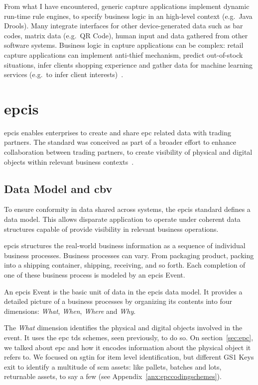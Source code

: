 From what I have encountered, generic capture applications implement dynamic run-time rule engines, to specify business logic in an high-level context (e.g.\ Java Drools).
Many integrate interfaces for other device-generated data such as bar codes, matrix data (e.g.\ QR Code), human input and data gathered from other software systems.
Business logic in capture applications can be complex: retail capture applications can implement anti-thief mechanism, predict out-of-stock situations, infer clients shopping experience and gather data for machine learning services (e.g.\ to infer client interests)~\cite{RFIDRetailKey}.

\section{\acf{epcis}}

\ac{epcis} enables enterprises to create and share \ac{epc} related data with trading partners.
The standard was conceived as part of a broader effort to enhance collaboration between trading partners, to create visibility of physical and digital objects within relevant business contexts~\cite{EPCISGuidelines}.

\subsection{Data Model and \acf{cbv}}

To ensure conformity in data shared across systems, the \ac{epcis} standard defines a data model. This allows disparate application to operate under coherent data structures capable of provide visibility in relevant business operations.

\ac{epcis} structures the real-world business information as a sequence of individual business processes.
Business processes can vary. From packaging product, packing into a shipping container, shipping, receiving, and so forth.
Each completion of one of these business process is modeled by an \ac{epcis} Event.

An \ac{epcis} Event is the basic unit of data in the \ac{epcis} data model.
It provides a detailed picture of a business processes by organizing its contents into four dimensions: \emph{What}, \emph{When}, \emph{Where} and \emph{Why}.

The \emph{What} dimension identifies the physical and digital objects involved in the event. It uses the \ac{epc} \ac{tds} schemes, seen previously, to do so.  On section~\ref{sec:epc}, we talked about \ac{epc} and how it encodes information about the physical object it refers to. We focused on \ac{sgtin} for item level identification, but different GS1 Keys exit to identify a multitude of \ac{scm} assets: like pallets, batches and lots, returnable assets, to say a few (see Appendix~\ref{anx:epccodingschemes}).

